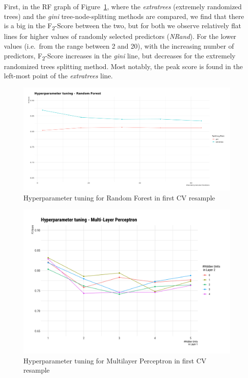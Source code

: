 First, in the RF graph of Figure~\ref{fig:params-ranger}, where the \textit{extratrees} (extremely randomized trees) and the \textit{gini} tree-node-splitting methods are compared, we find that there is a big in the F\textsubscript{2}-Score between the two, but for both we observe relatively flat lines for higher values of randomly selected predictors (\textit{NRand}).
For the lower values (i.e.\ from the range between 2 and 20), with the increasing number of predictors, F\textsubscript{2}-Score increases in the \textit{gini} line, but decreases for the extremely randomized trees splitting method.
Most notably, the peak score is found in the left-most point of the \textit{extratrees} line.

\begin{figure}[H]
    \caption{Hyperparameter tuning for Random Forest in first CV resample}
    \centerline{\includegraphics[scale=.21]{../reports/results/models_and_evals/summary/params_ranger_resample_1.png}}
    \label{fig:params-ranger}
\end{figure}

\begin{figure}[H]
    \caption{Hyperparameter tuning for Multilayer Perceptron in first CV resample}
    \centerline{\includegraphics[scale=.21]{../reports/results/models_and_evals/summary/params_mlpML_resample_1.png}}
    \label{fig:params-mlp}
\end{figure}


